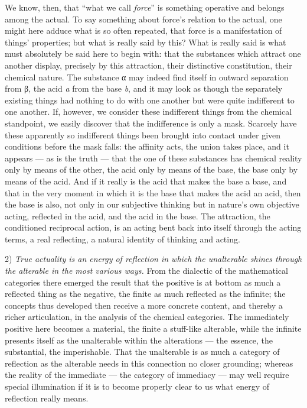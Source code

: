 \documentclass[12pt,a4paper]{book}
\begin{document}
We know, then, that ``what we call \emph{force}'' is something operative and
belongs among the actual. To say something about force's relation to the
actual, one might here adduce what is so often repeated, that force is a
manifestation of things' properties; but what is really said by this? What is
really said is what must absolutely be said here to begin with: that the
substances which attract one another display, precisely by this attraction,
their distinctive constitution, their chemical nature. The substance α may
indeed find itself in outward separation from β, the acid \textit{a} from the
base \textit{b}, and it may look as though the separately existing things had
nothing to do with one another but were quite indifferent to one another.
If, however, we consider these indifferent things from the chemical
standpoint, we easily discover that the indifference is only a mask. Scarcely
have these apparently so indifferent things been brought into contact under
given conditions before the mask falls: the affinity acts, the union takes
place, and it appears --- as is the truth --- that the one of these substances
has chemical reality only by means of the other, the acid only by means of the
base, the base only by means of the acid. And if it really is the acid that
makes the base a base, and that in the very moment in which it is the base that
makes the acid an acid, then the base is also, not only in our subjective
thinking but in nature's own objective acting, reflected in the acid, and the
acid in the base. The attraction, the conditioned reciprocal action, is an
acting bent back into itself through the acting terms, a real reflecting, a
natural identity of thinking and acting.

2) \emph{True actuality is an energy of reflection in which the unalterable
shines through the alterable in the most various ways.} From the dialectic of
the mathematical categories there emerged the result that the positive is at
bottom as much
a reflected thing as the negative, the finite as much reflected as the
infinite; the concepts thus developed then receive a more concrete content, and
thereby a richer articulation, in the analysis of the chemical categories. The
immediately positive here becomes a material, the finite a stuff-like
alterable, while the infinite presents itself as the unalterable within the
alterations --- the essence, the substantial, the imperishable. That the
unalterable is as much a category of reflection as the alterable needs in this
connection no closer grounding; whereas the reality of the immediate --- the
category of immediacy --- may well require special illumination if it is to
become properly clear to us what energy of reflection really means.
\end{document}
